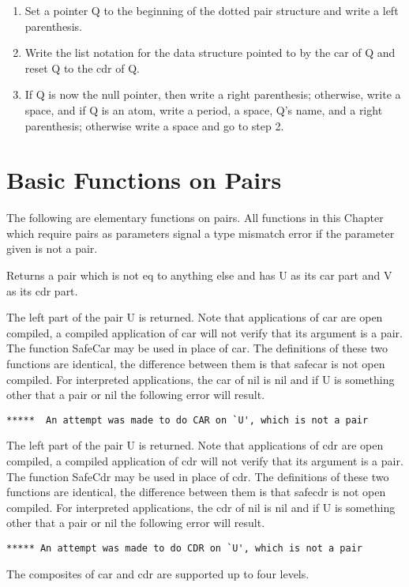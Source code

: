 \begin{enumerate}
\item  Set  a  pointer  Q  to  the  beginning  of  the dotted pair
     structure and write a left parenthesis.
\item  Write the list notation for the data structure  pointed  to
     by the car of Q and reset Q to the cdr of Q.
\item  If   Q  is  now  the  null  pointer,  then  write  a  right
     parenthesis; otherwise, write a space, and if Q is an atom,
     write a period, a space, Q's name, and a right parenthesis;
     otherwise write a space and go to step 2.
\end{enumerate}

\section{Basic Functions on Pairs}

The  following  are  elementary  functions  on  pairs. All
functions  in  this  Chapter  which  require pairs as parameters
signal a type mismatch error if the parameter  given  is  not  a
pair.


{    Returns a pair which is not eq to anything else and has U as
    its car part and  V as its cdr part.
}

{    The  left  part  of  the  pair  U  is  returned.   Note that
    applications  of  car  are   open   compiled,   a   compiled
    application  of  car  will not verify that its argument is a
    pair.  The function SafeCar may be used  in  place  of  car.
    The  definitions  of  these two functions are identical, the
    difference  between  them  is  that  safecar  is  not   open
    compiled.    For interpreted applications, the car of nil is
    nil and if U is something other  that  a  pair  or  nil  the
    following error will result.
}
\begin{verbatim}
*****  An attempt was made to do CAR on `U', which is not a pair
\end{verbatim}

{    The left part  of  the  pair  U  is  returned.    Note  that
    applications   of   cdr   are   open  compiled,  a  compiled
    application of cdr will not verify that its  argument  is  a
    pair.    The  function  SafeCdr may be used in place of cdr.
    The definitions of these two functions  are  identical,  the
    difference   between  them  is  that  safecdr  is  not  open
    compiled.  For interpreted applications, the cdr of  nil  is
    nil  and  if  U  is  something  other that a pair or nil the
    following error will result.
}
\begin{verbatim}
***** An attempt was made to do CDR on `U', which is not a pair
\end{verbatim}
  The composites of car and cdr are supported up to four levels.

